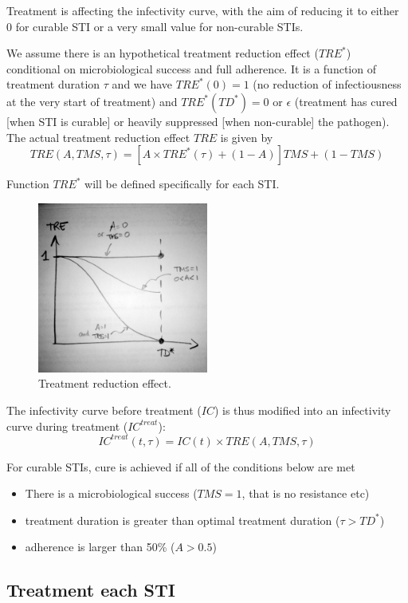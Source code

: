 \documentclass[11pt, onecolumn]{article}
\begin{document}
Treatment is affecting the infectivity curve, with the aim of reducing it to either 0 for curable STI or a very small value for non-curable STIs. 

We assume there is an hypothetical treatment reduction effect ($TRE^*$) conditional on microbiological success and full adherence. It is a function of treatment duration $\tau$ and we have $TRE^*(0)=1$ (no reduction of infectiousness at the very start of treatment) and $TRE^*(TD^*)=0$ or $\epsilon$ (treatment has cured [when STI is curable] or heavily suppressed [when non-curable] the pathogen). The actual treatment reduction effect $TRE$ is given by
$$TRE(A, TMS,\tau) = \left[A\times TRE^*(\tau) + (1-A) \right] TMS + (1-TMS) $$

Function $TRE^*$ will be defined specifically for each STI.

\begin{figure}[!ht]
\centering
    \includegraphics[angle=0,width=0.5\textwidth]{./figures/TRE.JPG}
\caption{Treatment reduction effect.}
\label{fig:TRE}
\end{figure}

The infectivity curve before treatment ($IC$) is thus modified into an infectivity curve during treatment ($IC^{treat}$):
$$IC^{treat}(t,\tau)= IC(t)\times TRE(A,TMS,\tau)  $$

For curable STIs, cure is achieved if all of the conditions below are met
\begin{itemize}
\item There is a microbiological success ($TMS=1$, that is no resistance etc)
\item treatment duration is greater than optimal treatment duration ($\tau>TD^*$)
\item adherence is larger than 50\% ($A>0.5$) 
\end{itemize}


\subsection{Treatment each STI}
\end{document}
